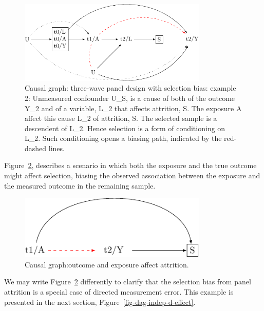 \documentclass[
  singlecolumn]{report}
\begin{document}
\begin{figure}

{\centering \includegraphics[width=0.8\textwidth,height=\textheight]{causal-dags_files/figure-pdf/fig-dag-8-2-1.pdf}

}

\caption{\label{fig-dag-8-2}Causal graph: three-wave panel design with
selection bias: example 2: Unmeasured confounder U\_S, is a cause of
both of the outcome Y\_2 and of a variable, L\_2 that affects attrition,
S. The exposure A affect this cause L\_2 of attrition, S. The selected
sample is a descendent of L\_2. Hence selection is a form of
conditioning on L\_2. Such conditioning opens a biasing path, indicated
by the red-dashed lines.}

\end{figure}

Figure~\ref{fig-dag-8-5}, describes a scenario in which both the
exposure and the true outcome might affect selection, biasing the
observed association between the exposure and the measured outcome in
the remaining sample.

\begin{figure}

{\centering \includegraphics[width=0.8\textwidth,height=\textheight]{causal-dags_files/figure-pdf/fig-dag-8-5-1.pdf}

}

\caption{\label{fig-dag-8-5}Causal graph:outcome and exposure affect
attrition.}

\end{figure}

We may write Figure~\ref{fig-dag-8-5} differently to clarify that the
selection bias from panel attrition is a special case of directed
measurement error. This example is presented in the next section,
Figure~\ref{fig-dag-indep-d-effect}.
\end{document}
